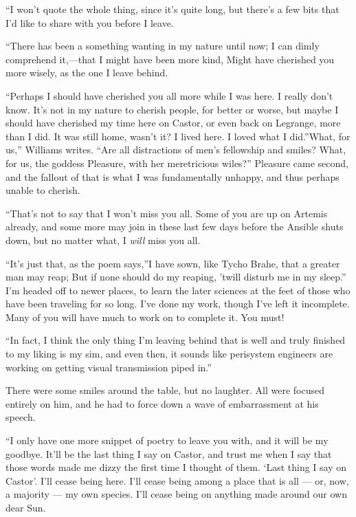 ``I won't quote the whole thing, since it's quite long, but there's a few bits that I'd like to share with you before I leave.

``There has been a something wanting in my nature until now; I can dimly comprehend it,—that I might have been more kind, Might have cherished you more wisely, as the one I leave behind.

``Perhaps I should have cherished you all more while I was here. I really don't know. It's not in my nature to cherish people, for better or worse, but maybe I should have cherished my time here on Castor, or even back on Legrange, more than I did. It was still home, wasn't it? I lived here. I loved what I did.''What, for us,'' Williams writes. ``Are all distractions of men's fellowship and smiles? What, for us, the goddess Pleasure, with her meretricious wiles?'' Pleasure came second, and the fallout of that is what I was fundamentally unhappy, and thus perhaps unable to cherish.

``That's not to say that I won't miss you all. Some of you are up on Artemis already, and some more may join in these last few days before the Ansible shuts down, but no matter what, I \emph{will} miss you all.

``It's just that, as the poem says,''I have sown, like Tycho Brahe, that a greater man may reap; But if none should do my reaping, 'twill disturb me in my sleep.'' I'm headed off to newer places, to learn the later sciences at the feet of those who have been traveling for so long. I've done my work, though I've left it incomplete. Many of you will have much to work on to complete it. You must!

``In fact, I think the only thing I'm leaving behind that is well and truly finished to my liking is my sim, and even then, it sounds like perisystem engineers are working on getting visual transmission piped in.''

There were some smiles around the table, but no laughter. All were focused entirely on him, and he had to force down a wave of embarrassment at his speech.

``I only have one more snippet of poetry to leave you with, and it will be my goodbye. It'll be the last thing I say on Castor, and trust me when I say that those words made me dizzy the first time I thought of them. `Last thing I say on Castor'. I'll cease being here. I'll cease being among a place that is all — or, now, a majority — my own species. I'll cease being on anything made around our own dear Sun.

